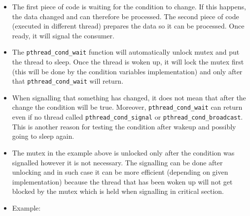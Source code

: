 \begin{itemize}
\prgchars
\item The first piece of code is waiting for the condition to change.
If this happens, the data changed and can therefore be processed.
The second piece of code (executed in different thread) prepares the
data so it can be processed. Once ready, it will signal the consumer.
\item The \texttt{pthread\_cond\_wait} function will automatically unlock mutex
and put the thread to sleep. Once the thread is woken up, it will lock the
mutex first (this will be done by the condition variables implementation)
and only after that \texttt{pthread\_cond\_wait} will return.
\item When signalling that something has changed, it does not mean that after
the change the condition will be true. Moreover,
\texttt{pthread\_cond\_wait} can return even if no thread called
\texttt{pthread\_cond\_signal} or \texttt{pthread\_cond\_broadcast}.
This is another reason for testing the condition after wakeup and possibly
going to sleep again.
\item The mutex in the example above is unlocked only after the condition
was signalled however it is not necessary. The signalling can be done
after unlocking and in such case it can be more efficient (depending on
given implementation) because the thread that has been woken up will not
get blocked by the mutex which is held when signalling in critical section.
\item \label{QUEUESIMULATION} Example: 
\end{itemize}




